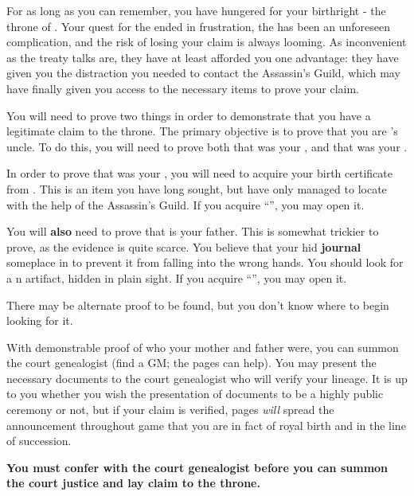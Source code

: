 \documentclass[green]{NeptuneBall}
\begin{document}
\name{\gLineage{}}

For as long as you can remember, you have hungered for your birthright - the throne of \pAtlantis{}.  Your quest for the \iTrident{\MYname} ended in frustration, the \iMusicBox{\MYname} has been an unforeseen complication, and the risk of losing your claim is always looming. 
As inconvenient as the treaty talks are, they have at least afforded you one advantage: they have given you the distraction you needed to contact the Assassin's Guild, which may have finally given you access to the necessary items to prove your claim.

You will need to prove two things in order to demonstrate that you have a legitimate claim to the throne. The primary objective is to prove that you are \cKing{\King} \cKing{}'s uncle. To do this, you will need to prove both that \cMother{} was your \cMother{\parent}, and that \cExExKing{} was your \cExExKing{\parent}.

In order to prove that \cMother{} was your \cMother{\parent}, you will need to acquire your birth certificate from \cDiplomat{}. This is an item you have long sought, but have only managed to locate with the help of the Assassin's Guild. If you acquire ``\iBirthCertificate{}'', you may open it.

You will {\bf also} need to prove that \cExExKing{} is your father. This is somewhat trickier to prove, as the evidence is quite scarce. You believe that your \cMother{\parent} hid {\bf \cMother{\their} journal} someplace in \pAtlantis{} to prevent it from falling into the wrong hands. You should look for a \pPacifica{}n artifact, hidden in plain sight. If you acquire ``\iJournal{}'', you may open it.

There may be alternate proof to be found, but you don't know where to begin looking for it.

With demonstrable proof of who your mother and father were, you can summon the court genealogist (find a GM; the pages can help). You may present the necessary documents to the court genealogist who will verify your lineage. It is up to you whether you wish the presentation of documents to be a highly public ceremony or not, but if your claim is verified, pages \emph{will} spread the announcement throughout game that you are in fact of royal birth and in the line of succession.

{\bf You must confer with the court genealogist before you can summon the court justice and lay claim to the throne.}
\end{document}
